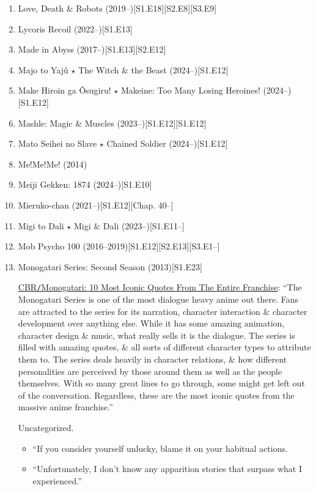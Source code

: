 \documentclass{article}
\begin{document}
\begin{enumerate}
    \item Love, Death \& Robots (2019--)\hfill[S1.E18][S2.E8][S3.E9]
    \item Lycoris Recoil (2022--)\hfill[S1.E13]
    \item Made in Abyss (2017--)\hfill[S1.E13][S2.E12]
    \item {\sc Majo to Yajû $\star$ The Witch \& the Beast} (2024--)\hfill[S1.E12]
    \item {\sc Make Hiroin ga Ôsugiru! $\star$ Makeine: Too Many Losing Heroines!} (2024--)\hfill[S1.E12]
    \item {\sc Mashle: Magic \& Muscles} (2023--)\hfill[S1.E12][S1.E12]
    \item {\sc Mato Seihei no Slave $\star$ Chained Soldier} (2024--)\hfill[S1.E12]
    \item {\sc Me!Me!Me!} (2014)
    \item {\sc Meiji Gekken: 1874} (2024--)\hfill[S1.E10]
    \item Mieruko-chan (2021--)\hfill[S1.E12][Chap. 40--]
    \item Migi to Dali $\star$ Migi \& Dali (2023--)\hfill[S1.E11--]
    \item Mob Psycho 100 (2016--2019)\hfill[S1.E12][S2.E13][S3.E1--]
    \item {\sc Monogatari Series: Second Season} (2013)\hfill[S1.E23]
    
    \href{https://www.cbr.com/monogatari-series-best-quotes/}{CBR{\tt/}Monogatari: 10 Most Iconic Quotes From The Entire Franchise}: ``The Monogatari Series is one of the most dialogue heavy anime out there. Fans are attracted to the series for its narration, character interaction \& character development over anything else. While it has some amazing animation, character design \& music, what really sells it is the dialogue. The series is filled with amazing quotes, \& all sorts of different character types to attribute them to. The series deals heavily in character relations, \& how different personalities are perceived by those around them as well as the people themselves. With so many great lines to go through, some might get left out of the conversation. Regardless, these are the most iconic quotes from the massive anime franchise.''
    
    {\sf Uncategorized.}
    \begin{itemize}
    	\item ``If you consider yourself unlucky, blame it on your habitual actions.\\
    	\item ``Unfortunately, I don't know any apparition stories that surpass what I experienced.''
    \end{itemize}
    

\end{enumerate}
\end{document}
